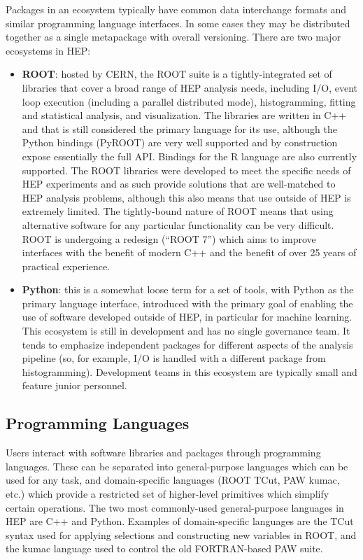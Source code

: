 Packages in an ecosystem typically have common data interchange formats and similar programming language interfaces. In some cases they may be distributed together as a single metapackage with overall versioning. There are two major ecosystems in HEP:
\begin{itemize}
    \item \textbf{ROOT}: hosted by CERN, the ROOT suite is a tightly-integrated set of libraries that cover a broad range of HEP analysis needs, including I/O, event loop execution (including a parallel distributed mode), histogramming, fitting and statistical analysis, and visualization. The libraries are written in C++ and that is still considered the primary language for its use, although the Python bindings (PyROOT) are very well supported and by construction expose essentially the full API.  Bindings for the R language are also currently supported. The ROOT libraries were developed to meet the specific needs of HEP experiments and as such provide solutions that are well-matched to HEP analysis problems, although this also means that use outside of HEP is extremely limited. The tightly-bound nature of ROOT means that using alternative software for any particular functionality can be very difficult. ROOT is undergoing a redesign (``ROOT 7'') which aims to improve interfaces with the benefit of modern C++ and the benefit of over 25 years of practical experience.
    \item \textbf{Python}: this is a somewhat loose term for a set of tools, with Python as the primary language interface, introduced with the primary goal of enabling the use of software developed outside of HEP, in particular for machine learning. This ecosystem is still in development and has no single governance team. It tends to emphasize independent packages for different aspects of the analysis pipeline (so, for example, I/O is handled with a different package from histogramming). Development teams in this ecosystem are typically small and feature junior personnel. 
\end{itemize}

\subsection{Programming Languages}
Users interact with software libraries and packages through programming languages. These can be separated into general-purpose languages which can be used for any task, and domain-specific languages (ROOT TCut, PAW kumac, etc.) which provide a restricted set of higher-level primitives which simplify certain operations. The two most commonly-used general-purpose languages in HEP are C++ and Python. Examples of domain-specific languages are the TCut syntax used for applying selections and constructing new variables in ROOT, and the kumac language used to control the old FORTRAN-based PAW suite.

